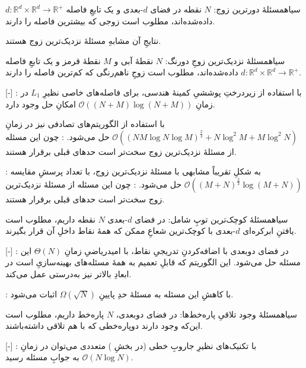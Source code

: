 \documentclass[a4paper,12pt]{article}
\renewcommand{\O}[1]{\mathcal{O}(#1)}
\begin{document}
‌سیاه{مسئلهٔ دورترین زوج}: 
\(N\)
نقطه در فضای \(d\)-بعدی و یک تابعِ فاصله 
\(d: \mathbb{R}^d \times \mathbb{R}^d \to \mathbb{R}^+\)
داده‌شده‌اند، مطلوب است زوجی که بیشترین فاصله را دارند.
 
نتایجِ آن مشابهِ مسئلهٔ نزدیک‌ترین زوج هستند.

‌سیاه{مسئلهٔ نزدیک‌ترین زوجِ دورنگ}: 
$N$
نقطهٔ آبی و $M$ نقطهٔ قرمز و یک تابعِ فاصله 
\(d: \mathbb{R}^d \times \mathbb{R}^d \to \mathbb{R}^+\)
داده‌شده‌اند، مطلوب است زوجِ ناهم‌رنگی که کم‌ترین فاصله را دارند. \cite[]{kao}

[-]
: با استفاده از زیردرختِ پوششیِ کمینهٔ هندسی، برای فاصله‌های خاصی نظیرِ $L_1$ در زمانِ 
$\O{(N+M) \log (N+M)}$
 امکانِ حل وجود دارد.

با استفاده از الگوریتم‌های تصادفی نیز در زمانِ
$\O{(NM \log N\log M)^\frac{2}{3}+N\log^2M+M\log^2N}$
حل می‌شود.
: چون این مسئله از مسئلهٔ نزدیک‌ترین زوج سخت‌تر است حدهای قبلی برقرار هستند.

: به شکلِ تقریباً مشابهی با مسئلهٔ نزدیک‌ترین زوج، با تعداد پرسشِ مقایسه
$\O{(M+N)^{\frac{2}{3}} \log (M+N)}$
حل می‌شود.
: چون این مسئله از مسئلهٔ نزدیک‌ترین زوج سخت‌تر است حدهای قبلی برقرار هستند.


‌سیاه{مسئلهٔ کوچک‌ترین توپِ شامل}: در فضای $d$-بعدی $N$ نقطه داریم، مطلوب است یافتنِ ابرکره‌ای $d$-بعدی با کوچک‌ترین شعاعِ ممکن که همهٔ نقاط داخلِ آن قرار بگیرند.

[-]
: در فضای دوبعدی با اضافه‌کردنِ تدریجیِ نقاط، با امیدریاضیِ زمانِ
$\Theta(N)$
این مسئله حل می‌شود. این الگوریتم که قابلِ تعمیم به همهٔ مسئله‌های بهینه‌سازیِ 
است در ابعادِ بالاتر نیز به‌درستی عمل می‌کند.

: با کاهشِ این مسئله به مسئلهٔ 
حدِ پایینِ
$\Omega(\sqrt{N})$
اثبات می‌شود.


‌سیاه{مسئلهٔ وجود تلاقیِ پاره‌خط‌ها}: در فضای دوبعدی، $N$ پاره‌خط داریم، مطلوب است این‌که وجود دارند دوپاره‌خطی که با هم تلاقی داشته‌باشند.

[-]
: با تکنیک‌های نظیرِ جاروبِ خطی (در بخشِ ) متعددی می‌توان در زمانِ 
$\O{N\log N}$
به جوابِ مسئله رسید.
\end{document}
